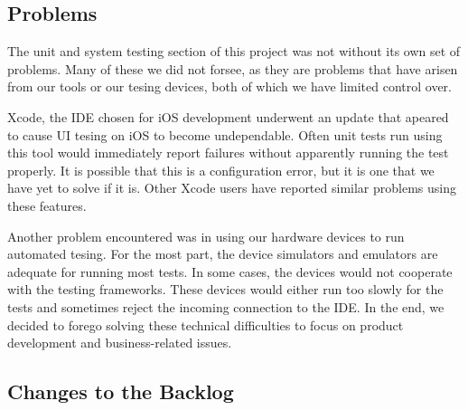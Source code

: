 \subsection{Problems}

The unit and system testing section of this project was not without its own set
of problems. Many of these we did not forsee, as they are problems that have
arisen from our tools or our tesing devices, both of which we have limited
control over.

Xcode, the IDE chosen for iOS development underwent an update that apeared to
cause UI tesing on iOS to become undependable. Often unit tests run using this
tool would immediately report failures without apparently running the test
properly. It is possible that this is a configuration error, but it is one that
we have yet to solve if it is. Other Xcode users have reported similar problems
using these features.

Another problem encountered was in using our hardware devices to run automated
tesing. For the most part, the device simulators and emulators are adequate for
running most tests. In some cases, the devices would not cooperate with the
testing frameworks. These devices would either run too slowly for the tests and
sometimes reject the incoming connection to the IDE. In the end, we decided to
forego solving these technical difficulties to focus on product development and
business-related issues.


\subsection{Changes to the Backlog}

